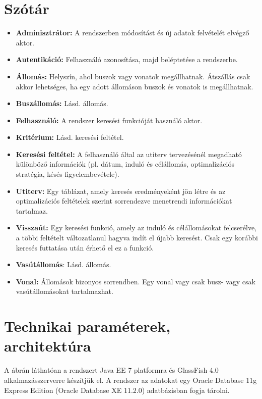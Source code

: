 \section*{Szótár}
\begin{itemize}
  \item[] \textbf{Adminisztrátor:} A rendszerben módosítást és új adatok
  felvételét elvégző aktor.
  \item[] \textbf{Autentikáció:} Felhasználó azonosítása, majd beléptetése a
  rendszerbe.
  \item[] \textbf{Állomás:} Helyszín, ahol buszok vagy vonatok megállhatnak.
  Átszállás csak akkor lehetséges, ha egy adott állomáson buszok és vonatok is
  megállhatnak.
  \item[] \textbf{Buszállomás:} Lásd. állomás.
  \item[] \textbf{Felhasználó:} A rendszer keresési funkcióját használó aktor.
  \item[] \textbf{Kritérium:} Lásd. keresési feltétel.
  \item[] \textbf{Keresési feltétel:} A felhasználó által az utiterv
  tervezésénél megadható különböző információk (pl. dátum, induló és célállomás,
  optimalizációs stratégia, késés figyelembevétele).
  \item[] \textbf{Utiterv:} Egy táblázat, amely keresés eredményeként jön létre
  és az optimalizációs feltételek szerint sorrendezve menetrendi információkat
  tartalmaz.
  \item[] \textbf{Visszaút:} Egy keresési funkció, amely az induló és
  célállomásokat felcserélve, a többi feltételt változatlanul hagyva indít el
  újabb keresést. Csak egy korábbi keresés futtatása után érhető el ez a
  funkció.
  \item[] \textbf{Vasútállomás}: Lásd. állomás.
  \item[] \textbf{Vonal:} Állomások bizonyos sorrendben. Egy vonal vagy csak
  busz- vagy csak vasútállomásokat tartalmazhat.
\end{itemize}

\section*{Technikai paraméterek, architektúra}
A  ábrán láthatóan a rendszert Java EE 7
platformra és GlassFish 4.0 alkalmazásszerverre készítjük el. A rendszer az
adatokat egy Oracle Database 11g Express Edition (Oracle Database XE 11.2.0)
adatbázisban fogja tárolni.

